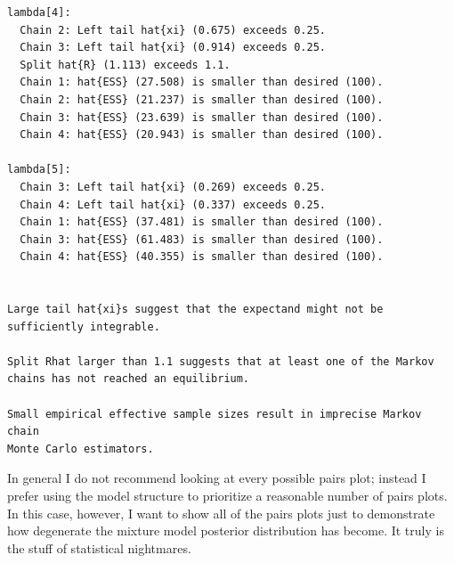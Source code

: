 \documentclass[
  letterpaper,
  DIV=11,
  numbers=noendperiod]{scrartcl}
\newenvironment{Shaded}{\begin{snugshade}}{\end{snugshade}}
\newcommand{\ControlFlowTok}[1]{\textcolor[rgb]{0.00,0.23,0.31}{#1}}
\newcommand{\DecValTok}[1]{\textcolor[rgb]{0.68,0.00,0.00}{#1}}
\newcommand{\FunctionTok}[1]{\textcolor[rgb]{0.28,0.35,0.67}{#1}}
\newcommand{\NormalTok}[1]{\textcolor[rgb]{0.00,0.23,0.31}{#1}}
\newcommand{\OtherTok}[1]{\textcolor[rgb]{0.00,0.23,0.31}{#1}}
\newcommand{\SpecialCharTok}[1]{\textcolor[rgb]{0.37,0.37,0.37}{#1}}
\newcommand{\StringTok}[1]{\textcolor[rgb]{0.13,0.47,0.30}{#1}}
\begin{document}
\begin{verbatim}
lambda[4]:
  Chain 2: Left tail hat{xi} (0.675) exceeds 0.25.
  Chain 3: Left tail hat{xi} (0.914) exceeds 0.25.
  Split hat{R} (1.113) exceeds 1.1.
  Chain 1: hat{ESS} (27.508) is smaller than desired (100).
  Chain 2: hat{ESS} (21.237) is smaller than desired (100).
  Chain 3: hat{ESS} (23.639) is smaller than desired (100).
  Chain 4: hat{ESS} (20.943) is smaller than desired (100).

lambda[5]:
  Chain 3: Left tail hat{xi} (0.269) exceeds 0.25.
  Chain 4: Left tail hat{xi} (0.337) exceeds 0.25.
  Chain 1: hat{ESS} (37.481) is smaller than desired (100).
  Chain 3: hat{ESS} (61.483) is smaller than desired (100).
  Chain 4: hat{ESS} (40.355) is smaller than desired (100).


Large tail hat{xi}s suggest that the expectand might not be
sufficiently integrable.

Split Rhat larger than 1.1 suggests that at least one of the Markov
chains has not reached an equilibrium.

Small empirical effective sample sizes result in imprecise Markov chain
Monte Carlo estimators.
\end{verbatim}

In general I do not recommend looking at every possible pairs plot;
instead I prefer using the model structure to prioritize a reasonable
number of pairs plots. In this case, however, I want to show all of the
pairs plots just to demonstrate how degenerate the mixture model
posterior distribution has become. It truly is the stuff of statistical
nightmares.

\begin{Shaded}
\end{Shaded}
\end{document}
